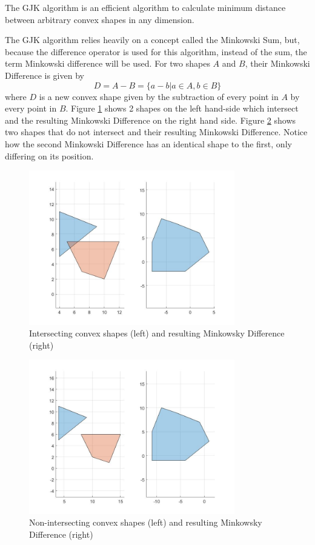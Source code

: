 \par The \ac{GJK} algorithm is an efficient algorithm to calculate minimum distance between arbitrary convex shapes in any dimension. 
\par The \ac{GJK} algorithm relies heavily on a concept called the Minkowski Sum, but, because the difference operator is used for this algorithm, instead of the sum, the term Minkowski difference will be used. For two shapes $A$ and $B$, their Minkowski Difference is given by
\begin{equation}
    D = A - B = \{a-b|a\in A, b\in B\}
\end{equation}
where $D$ is a new convex shape given by the subtraction of every point in $A$ by every point in $B$.
Figure \ref{fig:intersectingshapes} shows 2 shapes on the left hand-side which intersect and the resulting Minkowski Difference on the right hand side. Figure \ref{fig:nonintersectingshapes} shows two shapes that do not intersect and their resulting Minkowski Difference. Notice how the second Minkowski Difference has an identical shape to the first, only differing on its position.
\begin{figure}
\centering
\includegraphics[width=0.8\textwidth]{Images/intersectingshapes.jpg}
\caption{Intersecting convex shapes (left) and resulting Minkowsky Difference (right)}
\label{fig:intersectingshapes}
\end{figure}
\begin{figure}
\centering
\includegraphics[width=0.8\textwidth]{Images/nonintersectingshapes.jpg}
\caption{Non-intersecting convex shapes (left) and resulting Minkowsky Difference (right)}
\label{fig:nonintersectingshapes}
\end{figure}

